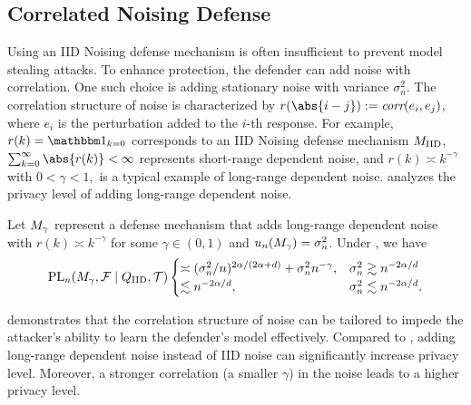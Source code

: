         

    \subsection{Correlated Noising Defense}\label{subsec:corr_noise}
    Using an IID Noising defense mechanism is often insufficient to prevent model stealing attacks. To enhance protection, the defender can add noise with correlation.
    One such choice is adding stationary noise with variance $\sigma_n^2$. The correlation structure of noise is characterized by $r(\abs{i-j})\defeq\corr(e_i,e_j)$, where $e_i$ is the perturbation added to the $i$-th response. For example, $r(k)=\ind_{k=0}$ corresponds to an IID Noising defense mechanism $M_{\textrm{IID}}$, $\sum_{k=0}^\infty \abs{r(k)} < \infty$ represents short-range dependent noise, and $r(k) \asymp k^{-\gamma} $ with $ 0<\gamma<1,$ is a typical example of long-range dependent noise.  analyzes the privacy level of adding long-range dependent noise.

   \begin{theorem}%
    \label{ex:hld_longrange}
        Let $M_{\gamma}$ represent a defense mechanism that adds long-range dependent noise with $r(k)\asymp k^{-\gamma}$ for some $\gamma \in (0,1)$ and $ u_n(M_{\gamma}) = \sigma_n^2$. 
        Under , we have 
        \begin{align*}
            \textrm{PL}_n(M_{\gamma},\mathcal{F}\mid Q_{\textrm{IID}},\mathcal{T})  \begin{cases} 
            \asymp (\sigma_n^2/n)^{2\alpha/(2\alpha+d)}+\sigma_n^2n^{-\gamma}, & \sigma_n^2 \gtrsim n^{-2\alpha/d} \\ 
            \lesssim n^{-2\alpha/d} , & \sigma_n^2 \lesssim n^{-2\alpha/d}.
            \end{cases}
        \end{align*}
    \end{theorem}

     demonstrates that the correlation structure of noise can be tailored to impede the attacker's ability to learn the defender's model effectively. Compared to , adding long-range dependent noise instead of IID noise can significantly increase privacy level. Moreover, a stronger correlation (a smaller $\gamma$) in the noise leads to a higher privacy level. 
    

